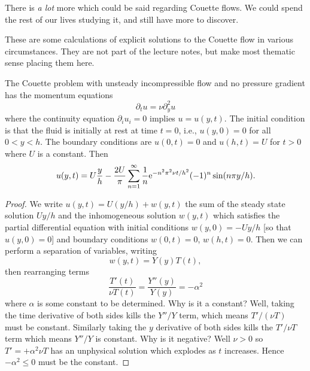 \begin{remark}
There is \emph{a lot} more which could be said regarding Couette
flows. We could spend the rest of our lives studying it, and still
have more to discover.
\end{remark}

\begin{framed}

\begin{node}
These are some calculations of explicit solutions to the Couette flow
in various circumstances. They are not part of the lecture notes, but
make most thematic sense placing them here.
\end{node}

\begin{proposition}
The Couette problem with unsteady incompressible flow and no pressure
gradient has the momentum equations
\begin{equation}
\partial_{t}u = \nu\partial_{y}^{2}u
\end{equation}
where the continuity equation $\partial_{i}u_{i}=0$ implies $u=u(y,t)$.
The initial condition is that the fluid is initially at rest at time
$t=0$, i.e., $u(y,0)=0$ for all $0<y<h$. The boundary conditions are
$u(0,t)=0$ and $u(h,t)=U$ for $t>0$ where $U$ is a constant. Then
\begin{equation}\label{eq:fall2026:me101a:lec09:soln-to-startup-problem-couette-flow}
u(y,t) =
U\frac{y}{h}-\frac{2U}{\pi}\sum^{\infty}_{n=1}\frac{1}{n}\mathrm{e}^{-n^{2}\pi^{2}\nu t/h^{2}}(-1)^{n}\sin(n\pi y/h).
\end{equation}
\end{proposition}
\begin{proof}
We write $u(y,t)=U(y/h) + w(y,t)$ the sum of the steady state solution $Uy/h$
and the inhomogeneous solution $w(y,t)$ which satisfies the partial
differential equation with initial conditions $w(y,0)=-Uy/h$ [so that
$u(y,0)=0$] and boundary conditions  $w(0,t)=0$, $w(h,t)=0$.
Then we can perform a separation of variables, writing
\begin{equation}
w(y,t) = Y(y)T(t),
\end{equation}
then rearranging terms
\begin{equation}
\frac{T'(t)}{\nu T(t)}=\frac{Y''(y)}{Y(y)}=-\alpha^{2}
\end{equation}
where $\alpha$ is some constant to be determined. Why is it a
constant? Well, taking the time derivative of both sides kills the
$Y''/Y$ term, which means $T'/(\nu T)$ must be constant. Similarly
taking the $y$ derivative of both sides kills the $T'/\nu T$ term
which means $Y''/Y$ is constant. Why is it negative? Well $\nu>0$ so
$T'=+\alpha^{2}\nu T$ has an unphysical solution which explodes as $t$
increases. Hence $-\alpha^{2}\leq0$ must be the constant.


\end{proof}
\end{framed}
